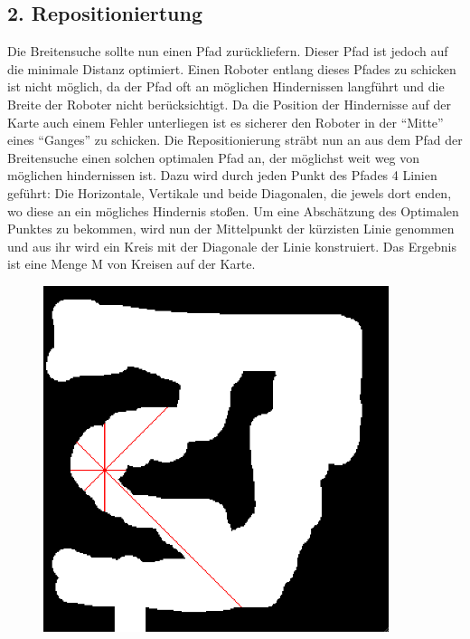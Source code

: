 \subsection*{2. Repositioniertung}
	Die Breitensuche sollte nun einen Pfad zurückliefern. Dieser Pfad ist jedoch auf die minimale Distanz optimiert. Einen Roboter entlang dieses Pfades zu schicken ist nicht möglich, da der Pfad oft an möglichen Hindernissen langführt und die Breite der Roboter nicht berücksichtigt. Da die Position der Hindernisse auf der Karte auch einem Fehler unterliegen ist es sicherer den Roboter in der ``Mitte'' eines ``Ganges'' zu schicken. Die Repositionierung sträbt nun an aus dem Pfad der Breitensuche einen solchen optimalen Pfad an, der möglichst weit weg von möglichen hindernissen ist. Dazu wird durch jeden Punkt des Pfades 4 Linien geführt: Die Horizontale, Vertikale und beide Diagonalen, die jewels dort enden, wo diese an ein mögliches Hindernis stoßen. Um eine Abschätzung des Optimalen Punktes zu bekommen, wird nun der Mittelpunkt der kürzisten Linie genommen und aus ihr wird ein Kreis mit der Diagonale der Linie konstruiert. Das Ergebnis ist eine Menge M von Kreisen auf der Karte. \\


\begin{figure}[ht]
    \centering
	\includegraphics[width=0.9\textwidth, angle=0]{img/p3.png}
\end{figure}

